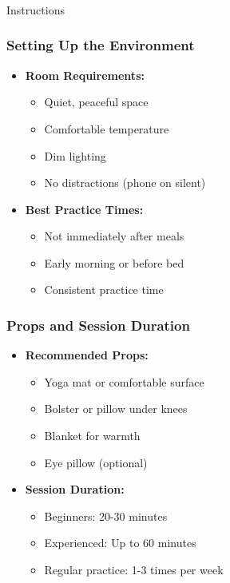 \begin{frame}[fragile]\frametitle{}
\begin{center}
{\Large Instructions}
\end{center}
\end{frame}

\begin{frame}[fragile]\frametitle{Setting Up the Environment}
    \begin{itemize}
        \item \textbf{Room Requirements:}
        \begin{itemize}
            \item Quiet, peaceful space
            \item Comfortable temperature
            \item Dim lighting
            \item No distractions (phone on silent)
        \end{itemize}
        \item \textbf{Best Practice Times:}
        \begin{itemize}
            \item Not immediately after meals
            \item Early morning or before bed
            \item Consistent practice time
        \end{itemize}
    \end{itemize}
\end{frame}

\begin{frame}[fragile]\frametitle{Props and Session Duration}
    \begin{itemize}
        \item \textbf{Recommended Props:}
        \begin{itemize}
            \item Yoga mat or comfortable surface
            \item Bolster or pillow under knees
            \item Blanket for warmth
            \item Eye pillow (optional)
        \end{itemize}
        \item \textbf{Session Duration:}
        \begin{itemize}
            \item Beginners: 20-30 minutes
            \item Experienced: Up to 60 minutes
            \item Regular practice: 1-3 times per week
        \end{itemize}
    \end{itemize}
\end{frame}



